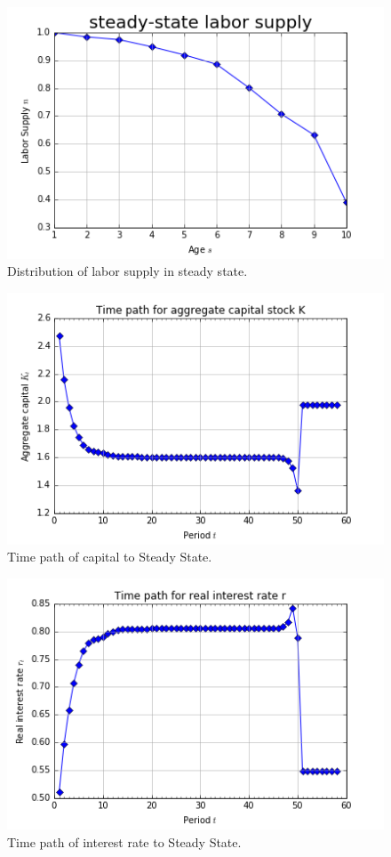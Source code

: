 \documentclass[letterpaper,12pt]{article}
\theoremstyle{definition}
\begin{document}
	\begin{figure}[h!]
	\centering
	\includegraphics[scale=.8]{code/images/SS_n}
	\caption{Distribution of labor supply in steady state.}
	\end{figure}
	
	\begin{figure}[h!]
	\centering
	\includegraphics[scale=.8]{code/images/Kpath}
	\caption{Time path of capital to Steady State.}
	\end{figure}
	
	\begin{figure}[h!]
	\centering
	\includegraphics[scale=.8]{code/images/rpath}
	\caption{Time path of interest rate to Steady State.}
	\end{figure}
\end{document}
